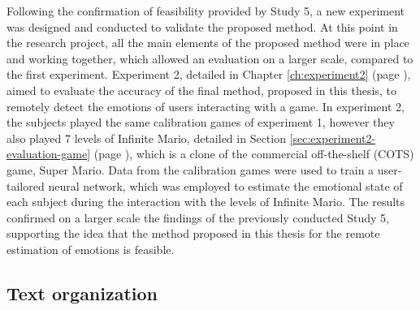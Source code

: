 Following the confirmation of feasibility provided by Study 5, a new experiment was designed and conducted to validate the proposed method. At this point in the research project, all the main elements of the proposed method were in place and working together, which allowed an evaluation on a larger scale, compared to the first experiment. Experiment 2, detailed in Chapter \ref{ch:experiment2} (page \pageref{ch:experiment2}), aimed to evaluate the accuracy of the final method, proposed in this thesis, to remotely detect the emotions of users interacting with a game. In experiment 2, the subjects played the same calibration games of experiment 1, however they also played 7 levels of Infinite Mario, detailed in Section \ref{sec:experiment2-evaluation-game} (page \pageref{sec:experiment2-evaluation-game}), which is a clone of the commercial off-the-shelf (COTS) game, Super Mario. Data from the calibration games were used to train a user-tailored neural network, which was employed to estimate the emotional state of each subject during the interaction with the levels of Infinite Mario. The results confirmed on a larger scale the findings of the previously conducted Study 5, supporting the idea that the method proposed in this thesis for the remote estimation of emotions is feasible.

\subsection{Text organization}

